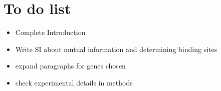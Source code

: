 \section{To do list}
\begin{itemize}
    \item Complete Introduction
    \item Write SI about mutual information and determining binding sites
    \item expand paragraphs for genes chosen
    \item check experimental details in methods
\end{itemize}
